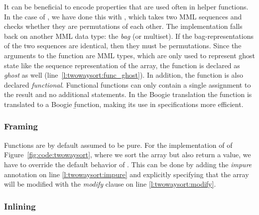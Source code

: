 It can be beneficial to encode properties that are used often in helper functions. In the case of , we have done this with , which takes two MML sequences and checks whether they are permutations of each other. The implementation falls back on another MML data type: the \emph{bag} (or multiset). If the bag-representations of the two sequences are identical, then they must be permutations. Since the arguments to the function are MML types, which are only used to represent ghost state like the sequence representation of the array, the function is declared as \emph{ghost} as well (line~\ref{l:twowaysort:func_ghost}). In addition, the function is also declared \emph{functional}. Functional functions can only contain a single assignment to the result and no additional statements. In the Boogie translation the function is translated to a Boogie \b{function}, making its use in specifications more efficient.


\subsubsection{Framing}

Functions are by default assumed to be pure. For the implementation of  of Figure~\ref{fig:code:twowaysort}, where we sort the array but also return a value, we have to override the default behavior of \AutoProof. This can be done by adding the \emph{impure} annotation on line \ref{l:twowaysort:impure} and explicitly specifying that the array will be modified with the \emph{modify} clause on line \ref{l:twowaysort:modify}.


\subsubsection{Inlining}


